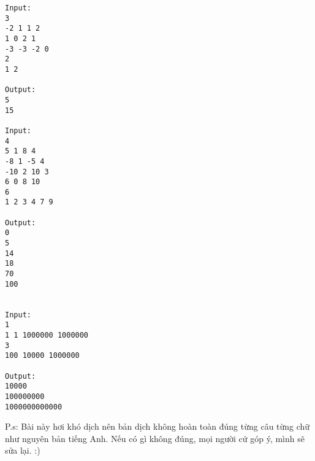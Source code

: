 \begin{verbatim}
Input:
3
-2 1 1 2
1 0 2 1
-3 -3 -2 0
2
1 2

Output:
5
15

Input:
4
5 1 8 4
-8 1 -5 4
-10 2 10 3
6 0 8 10
6
1 2 3 4 7 9

Output:
0
5
14
18
70
100


Input:
1
1 1 1000000 1000000
3
100 10000 1000000

Output:
10000
100000000
1000000000000

\end{verbatim}

   P.s: Bài này hơi khó dịch nên bản dịch không hoàn toàn đúng từng câu từng chữ như nguyên bản tiếng Anh. Nếu có gì không đúng, mọi người cứ góp ý, mình sẽ sửa lại. :)